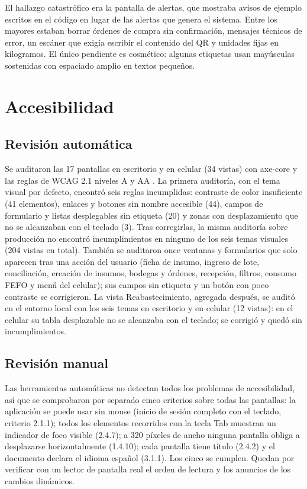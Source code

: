 El hallazgo catastrófico era la pantalla de alertas, que mostraba avisos de ejemplo escritos en el código en lugar de las alertas que genera el sistema. Entre los mayores estaban borrar órdenes de compra sin confirmación, mensajes técnicos de error, un escáner que exigía escribir el contenido del QR y unidades fijas en kilogramos. El único pendiente es cosmético: algunas etiquetas usan mayúsculas sostenidas con espaciado amplio en textos pequeños.

\section{Accesibilidad}
\label{sec:pru_wcag}

\subsection{Revisión automática}
Se auditaron las 17 pantallas en escritorio y en celular (34 vistas) con axe-core \cite{axe_core} y las reglas de WCAG 2.1 niveles A y AA \cite{w3c_wcag_overview}. La primera auditoría, con el tema visual por defecto, encontró seis reglas incumplidas: contraste de color insuficiente (41 elementos), enlaces y botones sin nombre accesible (44), campos de formulario y listas desplegables sin etiqueta (20) y zonas con desplazamiento que no se alcanzaban con el teclado (3). Tras corregirlas, la misma auditoría sobre producción no encontró incumplimientos en ninguno de los seis temas visuales (204 vistas en total). También se auditaron once ventanas y formularios que solo aparecen tras una acción del usuario (ficha de insumo, ingreso de lote, conciliación, creación de insumos, bodegas y órdenes, recepción, filtros, consumo FEFO y menú del celular); sus campos sin etiqueta y un botón con poco contraste se corrigieron. La vista Reabastecimiento, agregada después, se auditó en el entorno local con los seis temas en escritorio y en celular (12 vistas): en el celular su tabla desplazable no se alcanzaba con el teclado; se corrigió y quedó sin incumplimientos.

\subsection{Revisión manual}
Las herramientas automáticas no detectan todos los problemas de accesibilidad, así que se comprobaron por separado cinco criterios sobre todas las pantallas: la aplicación se puede usar sin mouse (inicio de sesión completo con el teclado, criterio 2.1.1); todos los elementos recorridos con la tecla Tab muestran un indicador de foco visible (2.4.7); a 320 píxeles de ancho ninguna pantalla obliga a desplazarse horizontalmente (1.4.10); cada pantalla tiene título (2.4.2) y el documento declara el idioma español (3.1.1). Los cinco se cumplen. Quedan por verificar con un lector de pantalla real el orden de lectura y los anuncios de los cambios dinámicos.

